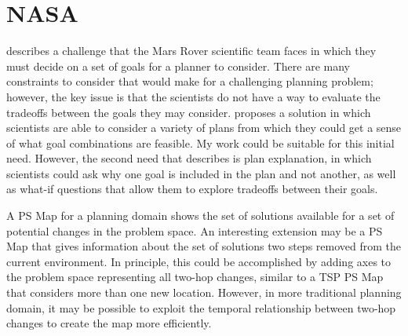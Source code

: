 {\section{NASA}

\cite{DBLP:conf/aaai/Smith12} describes a challenge that the Mars Rover scientific team faces in which they must decide on a set of goals for a planner to consider.  There are many constraints to consider that would make for a challenging planning problem; however, the key issue is that the scientists do not have a way to evaluate the tradeoffs between the goals they may consider.  \citeauthor{DBLP:conf/aaai/Smith12} proposes a solution in which scientists are able to consider a variety of plans from which they could get a sense of what goal combinations are feasible.  My work could be suitable for this initial need.  However, the second need that \citeauthor{DBLP:conf/aaai/Smith12} describes is plan explanation, in which scientists could ask why one goal is included in the plan and not another, as well as what-if questions that allow them to explore tradeoffs between their goals.  

A PS Map for a planning domain shows the set of solutions available for a set of potential changes in the problem space.  An interesting extension may be a PS Map that gives information about the set of solutions two steps removed from the current environment.  In principle, this could be accomplished by adding axes to the problem space representing all two-hop changes, similar to a TSP PS Map that considers more  than one new location. However, in more traditional planning domain, it may be possible to exploit the temporal relationship between two-hop changes to create the map more efficiently.




}
